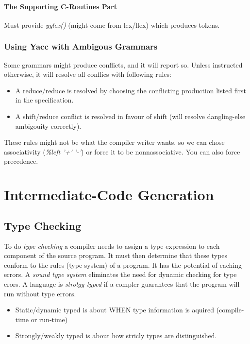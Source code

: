 \documentclass{article}
\begin{document}
\paragraph{The Supporting C-Routines Part} %
\label{par:The Supporting C-Routines Part}
Must provide \emph{yylex()} (might come from lex/flex) which produces tokens.

\subsubsection{Using Yacc with Ambigous Grammars} %
\label{ssub:Using Yacc with Ambigous Grammars}
Some grammars might produce conflicts, and it will report so. Unless instructed otherwise, it will resolve all conflics with following rules:
\begin{itemize}
	\item A reduce/reduce is resolved by choosing the conflicting production listed first in the specification.
	\item A shift/reduce conflict is resolved in favour of shift (will resolve dangling-else ambigouity correctly).
\end{itemize}
These rules might not be what the compiler writer wants, so we can chose associativity (\emph{\%left '+' '-'}) or force it to be nonnassociative. You can also force precedence.

\section{Intermediate-Code Generation} %
\label{sec:Intermediate-Code Generation}
\subsection{Type Checking} %
\label{sub:Type Checking}
To do \emph{type checking} a compiler needs to assign a type expression to each component of the source program. It must then determine that these types conform to the rules (type system) of a program. It has the potential of caching errors. A \emph{sound type system} eliminates the need for dynamic checking for type erors. A language is \emph{strolgy typed} if a compler guarantees that the program will run without type errors.
\begin{itemize}
	\item Static/dynamic typed is about WHEN type information is aquired (compile-time or run-time)
	\item Strongly/weakly typed is about how stricly types are distinguished.
\end{itemize}
\end{document}

